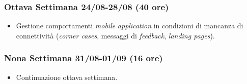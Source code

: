 \begin{trivlist}
\item \subsubsection{Ottava Settimana 24/08-28/08 (40 ore)}
\begin{itemize}
	\item Gestione comportamenti \emph{mobile} \emph{application} in condizioni di mancanza di connettività (\emph{corner cases}, messaggi di \emph{feedback}, \emph{landing pages}).
\end{itemize}

\item \subsubsection{Nona Settimana 31/08-01/09 (16 ore)}
\begin{itemize}
	\item Continuazione ottava settimana.
\end{itemize}
\end{trivlist}\clearpage

